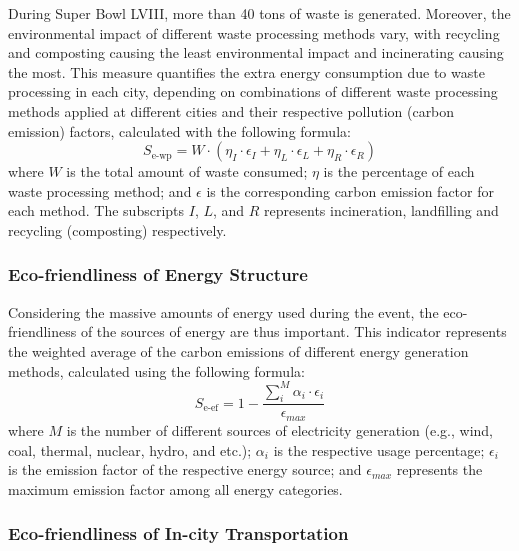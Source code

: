\documentclass{mcmthesis}
\begin{document}
During Super Bowl LVIII, more than 40 tons of waste is generated. Moreover, the environmental impact of different waste processing methods vary, with recycling and composting causing the least environmental impact and incinerating causing the most. This measure quantifies the extra energy consumption due to waste processing in each city, depending on combinations of different waste processing methods applied at different cities and their respective pollution (carbon emission) factors, calculated with the following formula: 
\begin{equation} \label{eq:waste_processing}
    S_\text{e-wp} = W \cdot \left( \eta_I \cdot \epsilon_I + \eta_L \cdot \epsilon_L + \eta_R \cdot \epsilon_R \right)
\end{equation}
where $W$ is the total amount of waste consumed; $\eta$ is the percentage of each waste processing method; and $\epsilon$ is the corresponding carbon emission factor for each method. The subscripts $I$, $L$, and $R$ represents incineration, landfilling and recycling (composting) respectively.



\subsubsection{Eco-friendliness of Energy Structure} \label{subsubsec:indicator_energy_structure}

Considering the massive amounts of energy used during the event, the eco-friendliness of the sources of energy are thus important. This indicator represents the weighted average of the carbon emissions of different energy generation methods, calculated using the following formula: 
\begin{equation} \label{eq:energy_structure}
S_\text{e-ef} = 1 - \frac{\sum^M_i \alpha_i \cdot \epsilon_i} {\epsilon_{max}}
\end{equation} where $M$ is the number of different sources of electricity generation (e.g., wind, coal, thermal, nuclear, hydro, and etc.);  $\alpha_i$ is the respective usage percentage; $\epsilon_i$ is the emission factor of the respective energy source; and $\epsilon_{max}$ represents the maximum emission factor among all energy categories.

\subsubsection{Eco-friendliness of In-city Transportation} \label{subsubsec:indicator_transportation}
\end{document}
